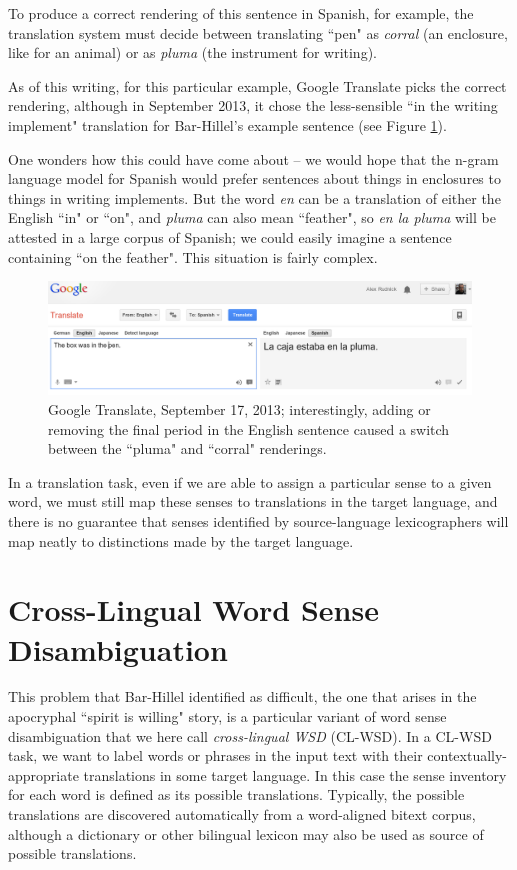 To produce a correct rendering of this sentence in Spanish, for example, the
translation system must decide between translating ``pen" as \emph{corral} (an
enclosure, like for an animal) or as \emph{pluma} (the instrument for writing).

As of this writing, for this particular example, Google Translate picks the
correct rendering, although in September 2013, it chose the less-sensible 
``in the writing implement" translation for Bar-Hillel's example sentence
(see Figure \ref{fig:box-in-pen}).

One wonders how this could have come about -- we would hope that the n-gram
language model for Spanish would prefer sentences about things in enclosures to
things in writing implements.
But the word \emph{en} can be a translation of either the English ``in" or
``on", and \emph{pluma} can also mean ``feather", so \emph{en la pluma} will be
attested in a large corpus of Spanish; we could easily imagine a sentence
containing ``on the feather". This situation is fairly complex.

\begin{figure}
  \includegraphics[width=12cm]{box-in-pen.png}
  \caption{Google Translate, September 17, 2013; interestingly, adding or
  removing the final period in the English sentence caused a switch between the
  ``pluma" and ``corral" renderings.}
  \label{fig:box-in-pen}
\end{figure}

In a translation task, even if we are able to assign a particular sense to a
given word, we must still map these senses to translations in the target
language, and there is no guarantee that senses identified by source-language
lexicographers will map neatly to distinctions made by the target language.

\section{Cross-Lingual Word Sense Disambiguation}
\label{sec:clwsd}

This problem that Bar-Hillel identified as difficult, the one that arises
in the apocryphal ``spirit is willing" story, is a particular variant of word
sense disambiguation that we here call \emph{cross-lingual WSD} (CL-WSD).
In a CL-WSD task, we  want to label words or phrases in the input text with
their contextually-appropriate translations in some target language. In this
case the
sense inventory for each word is defined as its possible translations.
Typically, the possible translations are discovered automatically from a
word-aligned bitext corpus, although a dictionary or other bilingual lexicon
may also be used as source of possible translations.

